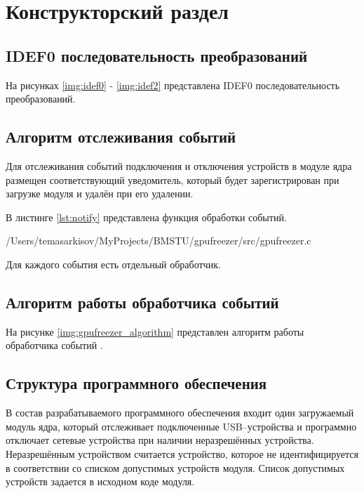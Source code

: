 \chapter{Конструкторский раздел}

\section{IDEF0 последовательность преобразований}

На рисунках \ref{img:idef0} - \ref{img:idef2} представлена IDEF0 последовательность преобразований.




\newpage
\section{Алгоритм отслеживания событий}

Для отслеживания событий подключения и отключения устройств в модуле ядра размещен соответствующий уведомитель, который будет зарегистрирован при загрузке модуля и удалён при его удалении.

В листинге \ref{lst:notify} представлена функция обработки событий.

\begin{lstinputlisting}[
	caption={Обработка событий},
	label={lst:notify},
	style={c},
	linerange={192-214},
	]{/Users/temasarkisov/MyProjects/BMSTU/gpufreezer/src/gpufreezer.c}
\end{lstinputlisting}

Для каждого события есть отдельный обработчик.

\newpage
\section{Алгоритм работы обработчика событий}

На рисунке \ref{img:gpufreezer_algorithm} представлен алгоритм работы обработчика событий .


\section{Структура программного обеспечения}

В состав разрабатываемого программного обеспечения входит один загружаемый модуль ядра, который отслеживает подключенные USB--устройства и программно отключает сетевые устройства при наличии неразрешённых устройства. Неразрешённым устройством считается устройство, которое не идентифицируется в соответствии со списком допустимых устройств модуля. Список допустимых устройств задается в исходном коде модуля.
